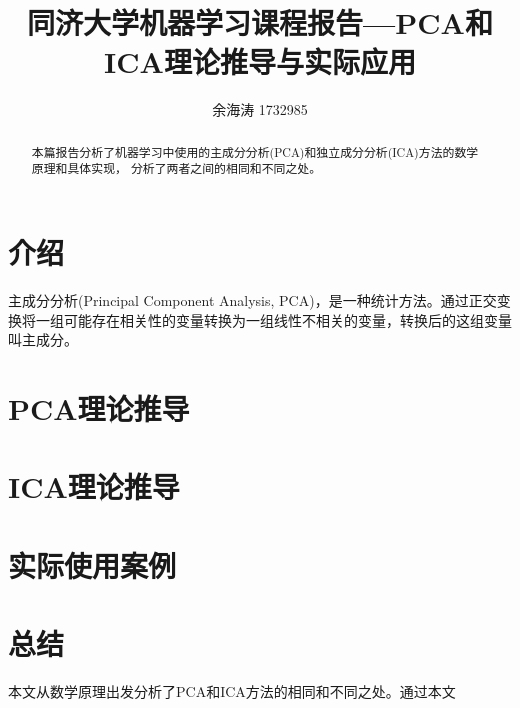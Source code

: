 \documentclass[UTF8,zihao=5]{ctexart}
\title{同济大学机器学习课程报告---PCA和ICA理论推导与实际应用}
\author{余海涛 1732985}
\begin{document}
\maketitle

\begin{abstract}
    本篇报告分析了机器学习中使用的主成分分析(PCA)和独立成分分析(ICA)方法的数学原理和具体实现，
    分析了两者之间的相同和不同之处。
\end{abstract}


\section{介绍}
主成分分析(Principal Component Analysis, PCA)，\cite{test1}是一种统计方法。通过正交变换将一组可能存在相关性的变量转换为一组线性不相关的变量，转换后的这组变量叫主成分。\cite{pca}

\section{PCA理论推导}

\section{ICA理论推导}

\section{实际使用案例}

\section{总结}
本文从数学原理出发分析了PCA和ICA方法的相同和不同之处。通过本文

% 

% 
\end{document}
